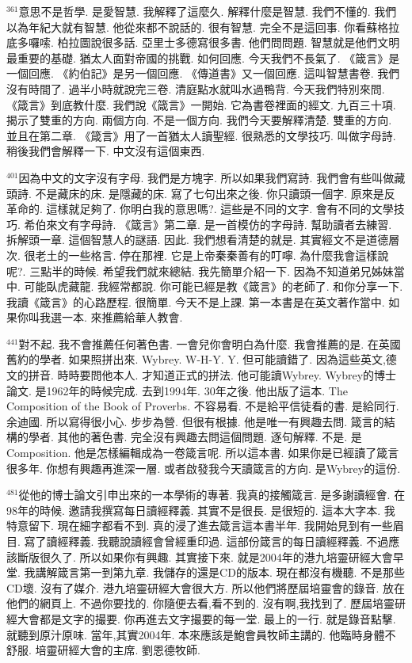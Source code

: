 \documentclass{book}
\begin{document}
$^{361}$意思不是哲學.
是愛智慧.
我解釋了這麼久.
解釋什麼是智慧.
我們不懂的.
我們以為年紀大就有智慧.
他從來都不說話的.
很有智慧.
完全不是這回事.
你看蘇格拉底多囉嗦.
柏拉圖說很多話.
亞里士多德寫很多書.
他們問問題.
智慧就是他們文明最重要的基礎.
猶太人面對帝國的挑戰.
如何回應.
今天我們不長氣了.
《箴言》是一個回應.
《約伯記》是另一個回應.
《傳道書》又一個回應.
這叫智慧書卷.
我們沒有時間了.
過半小時就說完三卷.
清庭點水就叫水過鴨背.
今天我們特別來問.
《箴言》到底教什麼.
我們說《箴言》一開始.
它為書卷裡面的經文.
九百三十項.
揭示了雙重的方向.
兩個方向.
不是一個方向.
我們今天要解釋清楚.
雙重的方向.
並且在第二章.
《箴言》用了一首猶太人讀聖經.
很熟悉的文學技巧.
叫做字母詩.
稍後我們會解釋一下.
中文沒有這個東西.

$^{401}$因為中文的文字沒有字母.
我們是方塊字.
所以如果我們寫詩.
我們會有些叫做藏頭詩.
不是藏床的床.
是隱藏的床.
寫了七句出來之後.
你只讀頭一個字.
原來是反革命的.
這樣就足夠了.
你明白我的意思嗎?.
這些是不同的文字.
會有不同的文學技巧.
希伯來文有字母詩.
《箴言》第二章.
是一首模仿的字母詩.
幫助讀者去練習.
拆解頭一章.
這個智慧人的謎語.
因此.
我們想看清楚的就是.
其實經文不是道德層次.
很老土的一些格言.
停在那裡.
它是上帝秦秦善有的叮嚀.
為什麼我會這樣說呢?.
三點半的時候.
希望我們就來總結.
我先簡單介紹一下.
因為不知道弟兄姊妹當中.
可能臥虎藏龍.
我經常都說.
你可能已經是教《箴言》的老師了.
和你分享一下.
我讀《箴言》的心路歷程.
很簡單.
今天不是上課.
第一本書是在英文著作當中.
如果你叫我選一本.
來推薦給華人教會.

$^{441}$對不起.
我不會推薦任何著色書.
一會兒你會明白為什麼.
我會推薦的是.
在英國舊約的學者.
如果照拼出來.
Wybrey.
W-H-Y.
Y.
但可能讀錯了.
因為這些英文,德文的拼音.
時時要問他本人.
才知道正式的拼法.
他可能讀Wybrey.
Wybrey的博士論文.
是1962年的時候完成.
去到1994年.
30年之後.
他出版了這本.
The Composition of the Book of Proverbs.
不容易看.
不是給平信徒看的書.
是給同行.
余迪國.
所以寫得很小心.
步步為營.
但很有根據.
他是唯一有興趣去問.
箴言的結構的學者.
其他的著色書.
完全沒有興趣去問這個問題.
逐句解釋.
不是.
是Composition.
他是怎樣編輯成為一卷箴言呢.
所以這本書.
如果你是已經讀了箴言很多年.
你想有興趣再進深一層.
或者啟發我今天讀箴言的方向.
是Wybrey的這份.

$^{481}$從他的博士論文引申出來的一本學術的專著.
我真的接觸箴言.
是多謝讀經會.
在98年的時候.
邀請我撰寫每日讀經釋義.
其實不是很長.
是很短的.
這本大字本.
我特意留下.
現在細字都看不到.
真的浸了進去箴言這本書半年.
我開始見到有一些眉目.
寫了讀經釋義.
我聽說讀經會曾經重印過.
這部份箴言的每日讀經釋義.
不過應該斷版很久了.
所以如果你有興趣.
其實接下來.
就是2004年的港九培靈研經大會早堂.
我講解箴言第一到第九章.
我儲存的還是CD的版本.
現在都沒有機聽.
不是那些CD壞.
沒有了媒介.
港九培靈研經大會很大方.
所以他們將歷屆培靈會的錄音.
放在他們的網頁上.
不過你要找的.
你隨便去看,看不到的.
沒有啊,我找到了.
歷屆培靈研經大會都是文字的撮要.
你再進去文字撮要的每一堂.
最上的一行.
就是錄音點擊.
就聽到原汁原味.
當年,其實2004年.
本來應該是鮑會員牧師主講的.
他臨時身體不舒服.
培靈研經大會的主席.
劉恩德牧師.
\end{document}

